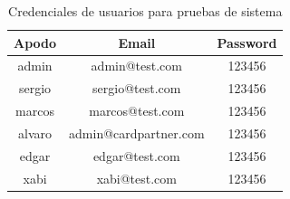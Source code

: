 \documentclass[10pt]{article}
\begin{document}
	\begin{table}[H]
		\centering
		
		\vspace{0.3cm} %
		\begin{tabular}{c c c} 
			\toprule
			\textbf{Apodo} & \textbf{Email} & \textbf{Password} \\
			\midrule
			admin  & admin@test.com        & 123456 \\
			sergio & sergio@test.com       & 123456 \\
			marcos & marcos@test.com       & 123456 \\
			alvaro & admin@cardpartner.com & 123456 \\
			edgar  & edgar@test.com        & 123456 \\
			xabi   & xabi@test.com         & 123456 \\
			\bottomrule
		\end{tabular}
		\caption{Credenciales de usuarios para pruebas de sistema}
		\label{tausuarios_prueba}
	\end{table}
	\newpage
\end{document}
